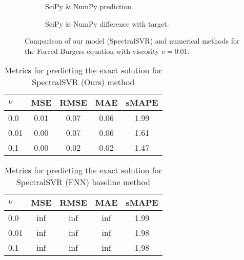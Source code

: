 \begin{figure}[H]
\begin{adjustwidth}{-0.05\linewidth}{-0.05\linewidth}
\begin{subfigure}{0.49\linewidth}
    \end{subfigure}
    \begin{subfigure}{0.49\linewidth}
      \begin{adjustbox}{width=\linewidth}
        
      \end{adjustbox}
      \caption{SciPy \& NumPy prediction.}\label{fig:comp_spo_pred_0.01}
    \end{subfigure}
    \begin{subfigure}{0.49\linewidth}
      \begin{adjustbox}{width=\linewidth}
        
      \end{adjustbox}
      \caption{SciPy \& NumPy difference with target.}\label{fig:comp_spo_diff_0.01}
    \end{subfigure}
  \end{adjustwidth}
  \caption{Comparison of our model (SpectralSVR) and numerical methods for the Forced Burgers equation with viscosity \(\nu=0.01\).}\label{fig:comparison_burgers_0.01}
\end{figure}
\begin{table}[H]
  \caption{Metrics for predicting the exact solution for SpectralSVR (Ours) method}\label{table:comparison_exact_metrics_lssvr}
  \centering
  \begin{tabular}{lcccc}
    \toprule
    \(\nu \) & MSE  & RMSE & MAE  & sMAPE \\
    \midrule
    0.0      & 0.01 & 0.07 & 0.06 & 1.99  \\
    0.01     & 0.00 & 0.07 & 0.06 & 1.61  \\
    0.1      & 0.00 & 0.02 & 0.02 & 1.47  \\
    \bottomrule
  \end{tabular}
\end{table}
\begin{table}[H]
  \caption{Metrics for predicting the exact solution for SpectralSVR (FNN) baseline method}\label{table:comparison_exact_metrics_fnn}
  \centering
  \begin{tabular}{lcccc}
    \toprule
    \(\nu \) & MSE & RMSE & MAE & sMAPE \\
    \midrule
    0.0      & inf & inf  & inf & 1.99  \\
    0.01     & inf & inf  & inf & 1.98  \\
    0.1      & inf & inf  & inf & 1.98  \\
    \bottomrule
  \end{tabular}
\end{table}
